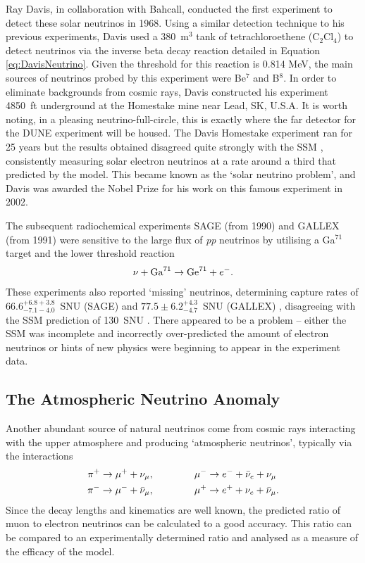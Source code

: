 Ray Davis, in collaboration with Bahcall, conducted the first experiment to detect these solar neutrinos in 1968.  Using a similar detection technique to his previous experiments, Davis used a 380~m$^3$ tank of tetrachloroethene (C$_2$Cl$_4$) to detect neutrinos via the inverse beta decay reaction detailed in Equation \ref{eq:DavisNeutrino}.  Given the threshold for this reaction is 0.814 MeV, the main sources of neutrinos probed by this experiment were Be$^7$ and B$^8$.  In order to eliminate backgrounds from cosmic rays, Davis constructed his experiment 4850~ft underground at the Homestake mine near Lead, SK, U.S.A.  It is worth noting, in a pleasing neutrino-full-circle, this is exactly where the far detector for the DUNE experiment will be housed.  The Davis Homestake experiment ran for 25 years but the results obtained \cite{Cleveland1995} disagreed quite strongly with the SSM \cite{Bahcall1995}, consistently measuring solar electron neutrinos at a rate around a third that predicted by the model.  This became known as the `solar neutrino problem', and Davis was awarded the Nobel Prize for his work on this famous experiment in 2002.

The subsequent radiochemical experiments SAGE (from 1990) and GALLEX (from 1991) were sensitive to the large flux of \textit{pp} neutrinos by utilising a Ga$^{71}$ target and the lower threshold reaction
\begin{equation}
\nu + \textnormal{Ga}^{71} \rightarrow \textnormal{Ge}^{71} + e^-.
\end{equation}
These experiments also reported `missing' neutrinos, determining capture rates of $66.6^{+6.8+3.8}_{-7.1-4.0}$~SNU (SAGE) \cite{Abdurashitov1994} and $77.5\pm6.2^{+4.3}_{-4.7}$~SNU (GALLEX) \cite{Anselmann1992}, disagreeing with the SSM prediction of 130~SNU \cite{Hampel1999}.  There appeared to be a problem -- either the SSM was incomplete and incorrectly over-predicted the amount of electron neutrinos or hints of new physics were beginning to appear in the experiment data.

\subsection{The Atmospheric Neutrino Anomaly}\label{sec:AtmosphericNeutrinoAnomaly}

Another abundant source of natural neutrinos come from cosmic rays interacting with the upper atmosphere and producing `atmospheric neutrinos', typically via the interactions \cite{Gaisser1990}
\begin{align}
  \pi^+ \rightarrow \mu^+ + \nu_{\mu}, &\hspace{1.5cm} \mu^- \rightarrow e^- + \bar{\nu}_e + \nu_{\mu} \\
  \pi^- \rightarrow \mu^- + \bar{\nu}_{\mu}, &\hspace{1.5cm} \mu^+ \rightarrow e^+ + \nu_e + \bar{\nu}_{\mu}.
\end{align}
Since the decay lengths and kinematics are well known, the predicted ratio of muon to electron neutrinos can be calculated to a good accuracy.  This ratio can be compared to an experimentally determined ratio and analysed as a measure of the efficacy of the model.

